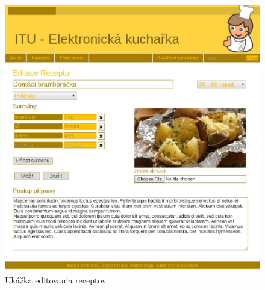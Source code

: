 \documentclass[12pt,a4paper,titlepage,final]{article}
\begin{document}
\begin{figure}

\begin{center}

\includegraphics[scale=0.7]{img/edit.eps} 
\caption{Ukážka editovania receptov}


\end{center}

\end{figure}
\end{document}
